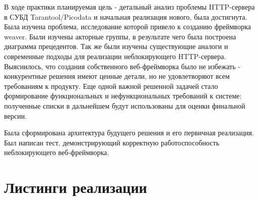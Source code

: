 \documentclass[times,numbers=noenddot]{itmo-student-thesis}
\begin{document}
\startconclusionpage

В ходе практики планируемая цель - детальный анализ проблемы HTTP-сервера в СУБД Tarantool/Picodata и начальная реализация нового, была достигнута.
Была изучена проблема, исследование которой привело к созданию фреймворка weaver.
Были изучены акторные группы, в результате чего была построена диаграмма прецедентов.
Так же были изучены существующие аналоги и современные подходы для реализации неблокирующего HTTP-сервера.
Выяснилось, что создания собственного веб-фреймворка было не избежать - конкурентные решения имеют ценные детали, но не удовлетворяют всем требованиям к продукту.
Еще одной важной решенной задачей стало формирование функциональных и нефункциональных требований к системе: полученные списки в дальнейшем будут использованы для оценки финальной версии.

Была сформирована архитектура будущего решения и его первичная реализация. Был написан тест, демонстрирующий корректную работоспособность неблокирующего веб-фреймворка.

\printmainbibliography

\appendix

\chapter{Листинги реализации}\label{sec:app:1}
\end{document}

